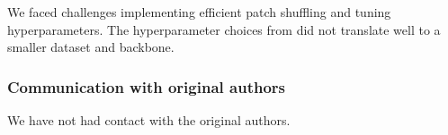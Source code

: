 
We faced challenges implementing efficient patch shuffling and tuning hyperparameters. The hyperparameter choices from \cite{mae} did not translate well to a smaller dataset and backbone.

\subsubsection*{Communication with original authors}


We have not had contact with the original authors.
